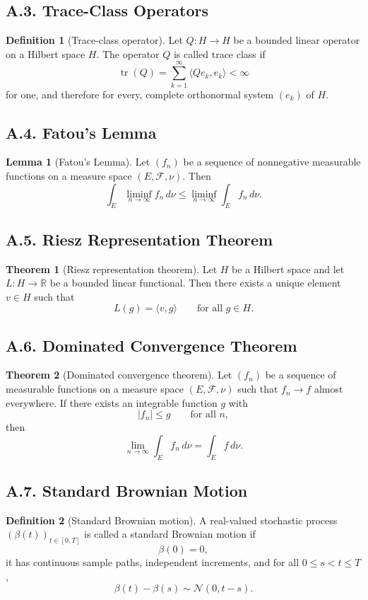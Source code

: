 \documentclass[11pt]{article}
\theoremstyle{definition}
\newtheorem{definition}{Definition}
\newtheorem{theorem}{Theorem}
\newtheorem{lemma}{Lemma}
\theoremstyle{remark}
\DeclareMathOperator{\tr}{tr}
\begin{document}
\subsection*{A.3. Trace-Class Operators}
\begin{definition}[Trace-class operator]
Let $Q:H\to H$ be a bounded linear operator on a Hilbert space $H$. The operator $Q$ is called trace class if
\[
\tr(Q)=\sum_{k=1}^{\infty}\langle Qe_k,e_k\rangle<\infty
\]
for one, and therefore for every, complete orthonormal system $(e_k)$ of $H$.
\end{definition}

\subsection*{A.4. Fatou's Lemma}
\begin{lemma}[Fatou's Lemma]
Let $(f_n)$ be a sequence of nonnegative measurable functions on a measure space $(E,\mathcal F,\nu)$. Then
\[
\int_E \liminf_{n\to\infty} f_n\,d\nu
\le
\liminf_{n\to\infty}\int_E f_n\,d\nu.
\]
\end{lemma}

\subsection*{A.5. Riesz Representation Theorem}
\begin{theorem}[Riesz representation theorem]
Let $H$ be a Hilbert space and let $L:H\to\mathbb R$ be a bounded linear functional. Then there exists a unique element $v\in H$ such that
\[
L(g)=\langle v,g\rangle
\qquad \text{for all } g\in H.
\]
\end{theorem}

\subsection*{A.6. Dominated Convergence Theorem}
\begin{theorem}[Dominated convergence theorem]
Let $(f_n)$ be a sequence of measurable functions on a measure space $(E,\mathcal F,\nu)$ such that $f_n\to f$ almost everywhere. If there exists an integrable function $g$ with
\[
|f_n|\le g
\qquad \text{for all } n,
\]
then
\[
\lim_{n\to\infty}\int_E f_n\,d\nu=\int_E f\,d\nu.
\]
\end{theorem}

\subsection*{A.7. Standard Brownian Motion}
\begin{definition}[Standard Brownian motion]
A real-valued stochastic process $(\beta(t))_{t\in[0,T]}$ is called a standard Brownian motion if
\[
\beta(0)=0,
\]
it has continuous sample paths, independent increments, and for all $0\le s<t\le T$,
\[
\beta(t)-\beta(s)\sim \mathcal N(0,t-s).
\]
\end{definition}
\end{document}
